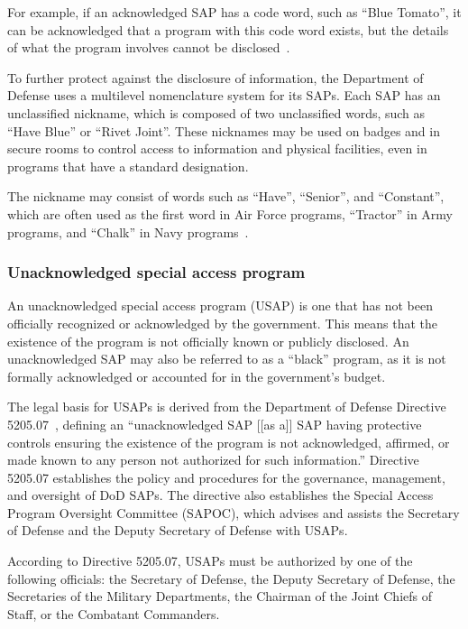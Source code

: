 For example, if an acknowledged SAP has a code word, such as ``Blue Tomato'', it can be acknowledged that a program with this code word exists, but the details of what the program involves cannot be disclosed~\cite{Dolan-MrX-Disclosure2020Jul}.

To further protect against the disclosure of information, the Department of Defense uses a multilevel nomenclature system for its SAPs. Each SAP has an unclassified nickname, which is composed of two unclassified words, such as ``Have Blue'' or ``Rivet Joint''. These nicknames may be used on badges and in secure rooms to control access to information and physical facilities, even in programs that have a standard designation.

The nickname may consist of words such as ``Have'', ``Senior'', and ``Constant'', which are often used as the first word in Air Force programs,
``Tractor'' in Army programs, and ``Chalk'' in Navy programs~\cite{Sweetman2000}.

\subsubsection{Unacknowledged special access program}

An unacknowledged special access program (USAP) is one that has not been officially recognized or acknowledged by the government. This means that the existence of the program is not officially known or publicly disclosed. An unacknowledged SAP may also be referred to as a ``black'' program, as it is not formally acknowledged or accounted for in the government's budget.

The legal basis for USAPs is derived from the Department of Defense Directive 5205.07~\cite{DODDirective5205.07}, defining
an ``unacknowledged SAP [[as a]]  SAP having protective controls ensuring the existence of the program
is not acknowledged, affirmed, or made known to any person not authorized for such  information.''
Directive 5205.07 establishes the policy and procedures for the governance, management, and oversight of DoD SAPs.
The directive also establishes the Special Access Program Oversight Committee (SAPOC),
which advises and assists the Secretary of Defense and the Deputy Secretary of Defense with USAPs.

According to Directive 5205.07, USAPs must be authorized by one of the following officials:
the Secretary of Defense, the Deputy Secretary of Defense, the Secretaries of the Military Departments, the Chairman of the Joint Chiefs of Staff, or the Combatant Commanders.


